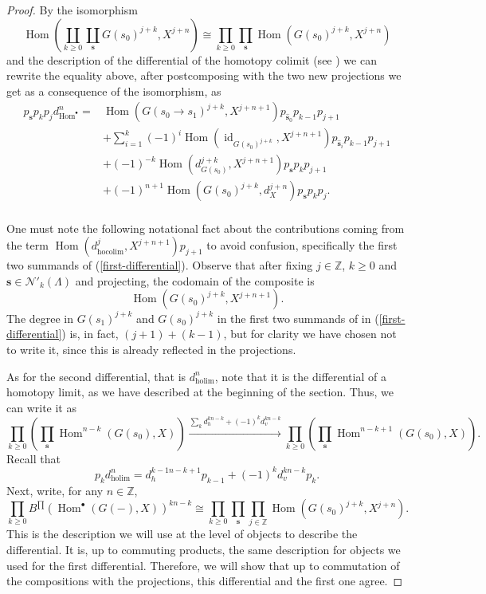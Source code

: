 \documentclass[reqno,11pt]{amsart}
\theoremstyle{plain}
\theoremstyle{remark}
\theoremstyle{definition}
\numberwithin{equation}{thm}
\newcommand{\CN}{\mathcal{N}}
\newcommand{\ZZ}{\mathbb{Z}}
\DeclareMathOperator{\Hom}{Hom}
\DeclareMathOperator{\id}{id}
\begin{document}
\begin{proof}
		By the isomorphism
		\[
			\Hom\left(\coprod_{k \geq 0}\coprod_{\textbf{s}}G(s_0)^{j+k}, X^{j+n}\right) \cong \prod_{k \geq 0}\prod_{\textbf{s}}\Hom\left(G(s_0)^{j+k}, X^{j+n}\right)
		\]
		 and the description of the differential of the homotopy colimit (see \cite[\S 2, p. 231]{AJS}) we can rewrite the equality above, after postcomposing with the two new projections we get as a consequence of the isomorphism, as 
		\begin{equation}\label{first-differential}
			\begin{aligned}
				p_{\textbf{s}} p_k p_j d_{\Hom^\bullet}^n =& \Hom\left(G(s_0 \to s_1)^{j+k}, X^{j+n+1}\right) p_{\widehat{\textbf{s}}_0}p_{k-1} p_{j+1} \\
				&+ \sum_{i=1}^{k} (-1)^i \Hom\left(\id_{G(s_0)^{j+k}}, X^{j+n+1}\right) p_{\widehat{\textbf{s}}_i} p_{k-1} p_{j+1} \\
				&+ (-1)^{-k} \Hom\left(d_{G(s_0)}^{j+k}, X^{j+n+1}\right) p_{\textbf{s}} p_k p_{j+1} \\			
				&+(-1)^{n+1} \Hom\left(G(s_0)^{j+k}, d_X^{j+n}\right) p_{\textbf{s}} p_k p_{j}. \\
			\end{aligned}	
		\end{equation}
		
		One must note the following notational fact about the contributions coming from the term $\Hom(d_{\text{hocolim}}^j, X^{j+n+1}) p_{j+1}$ to avoid confusion, specifically the first two summands of (\ref{first-differential}). Observe that after fixing $j \in \ZZ$, $k \geq 0$ and $\textbf{s} \in \CN'_k(\Lambda)$ and projecting, the codomain of the composite is 
		\[
			\Hom\left(G(s_0)^{j+k}, X^{j+n+1}\right).
		\]
		The degree in $G(s_1)^{j+k}$ and $G(s_0)^{j+k}$ in the first two summands of in (\ref{first-differential}) is, in fact, $(j+1)+(k-1)$, but for clarity we have chosen not to write it, since this is already reflected in the projections.
		
		As for the second differential, that is $d_{\text{holim}}^n$, note that it is the differential of a homotopy limit, as we have described at the beginning of the section. Thus, we can write it as
		\[
			\prod_{k \geq 0} \left(\prod_{\textbf{s}} \Hom^{n-k}\left(G(s_0), X\right)\right) \xrightarrow{\sum_{k} d_h^{k n-k} + (-1)^k d_v^{kn-k}} \prod_{k \geq 0} \left(\prod_{\textbf{s}} \Hom^{n-k+1}(G(s_0), X)\right).
		\]
		Recall that 
		\[
		p_k d_{\text{holim}}^n =  d_h^{k-1 n-k+1} p_{k-1} + (-1)^{k} d_v^{k n-k} p_k.
		\]
		Next, write, for any $n \in \ZZ$,
		\[
		\prod_{k \geq 0} B^{\prod}\left(\Hom^\bullet(G(-), X)\right)^{k n-k} \cong \prod_{k \geq 0} \prod_{\textbf{s}} \prod_{j \in \ZZ} \Hom\left(G(s_0)^{j+k}, X^{j+n}\right).
		\]
		This is the description we will use at the level of objects to describe the differential. It is, up to commuting products, the same description for objects we used for the first differential. Therefore, we will show that up to commutation of the compositions with the projections, this differential and the first one agree. 
		

\end{proof}
\end{document}
